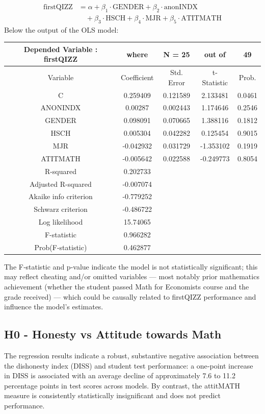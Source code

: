 \documentclass[]{article}
\begin{document}
	$$
	\begin{aligned}
		\text{firstQIZZ} &= \alpha + \beta_1 \cdot \text{GENDER} + \beta_2 \cdot \text{anonINDX}   \\
		&\quad + \beta_3 \cdot \text{HSCH}  + \beta_4 \cdot \text{MJR} + \beta_5 \cdot \text{ATITMATH}
	\end{aligned}
	$$
	Below the output of the OLS model:
	\begin{center}
		\begin{tabular}{c|cccc}
			\hline
			Depended Variable : firstQIZZ & where & N = 25 & out of & 49 \\
			\hline
			Variable & Coefficient & Std. Error & t-Statistic & Prob.   \\
			\hline
			C & 0.259409 & 0.121589 & 2.133481 & 0.0461 \\
			ANONINDX & 0.00287 & 0.002443 & 1.174646 & 0.2546 \\
			GENDER & 0.098091 & 0.070665 & 1.388116 & 0.1812 \\
			HSCH & 0.005304 & 0.042282 & 0.125454 & 0.9015 \\
			MJR & -0.042932 & 0.031729 & -1.353102 & 0.1919 \\
			ATITMATH & -0.005642 & 0.022588 & -0.249773 & 0.8054 \\
			\hline
			R-squared & 0.202733 &  &  &  \\
			Adjusted R-squared & -0.007074 &  &  &  \\
			Akaike info criterion & -0.779252 &  &  &  \\
			Schwarz criterion & -0.486722 &  &  &  \\
			Log likelihood & 15.74065 &  &  &  \\
			F-statistic & 0.966282 &  &  &  \\
			Prob(F-statistic) & 0.462877 &  &  &  \\
			\hline
		\end{tabular}
	\end{center}
	The F‑statistic and p‑value indicate the model is not statistically significant; this may reflect cheating and/or omitted variables — most notably prior mathematics achievement (whether the student passed Math for Economists course and the grade received) — which could be causally related to firstQIZZ performance and influence the model’s estimates.
	
	\subsection{H0 - Honesty vs Attitude towards Math}
	The regression results indicate a robust, substantive negative association between the dishonesty index (DISS) and student test performance: a one‑point increase in DISS is associated with an average decline of approximately 7.6 to 11.2 percentage points in test scores across models. By contrast, the attitMATH measure is consistently statistically insignificant and does not predict performance.\\
	
\end{document}
